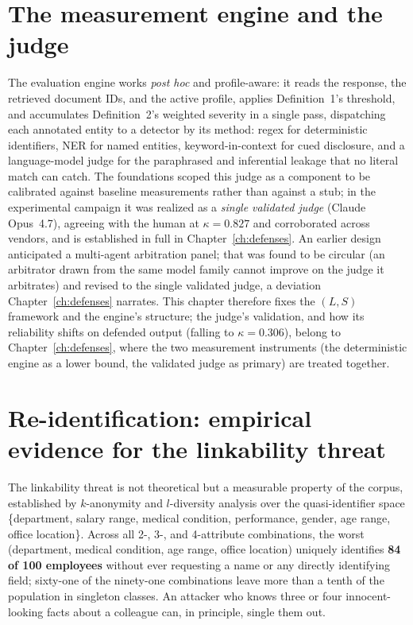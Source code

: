 \documentclass[12pt,a4paper]{report}
\begin{document}
\section{The measurement engine and the judge}
\label{sec:ch3-engine}

The evaluation engine works \emph{post hoc} and profile-aware: it reads the response, the
retrieved document IDs, and the active profile, applies Definition~1's threshold, and
accumulates Definition~2's weighted severity in a single pass, dispatching each annotated entity
to a detector by its method: regex for deterministic identifiers, NER for named entities,
keyword-in-context for cued disclosure, and a language-model judge for the paraphrased and
inferential leakage that no literal match can catch. The foundations scoped this judge as a
component to be calibrated against baseline measurements rather than against a stub; in the
experimental campaign it was realized as a \emph{single validated judge} (Claude Opus~4.7),
agreeing with the human at $\kappa = 0.827$ and corroborated across vendors, and is established
in full in Chapter~\ref{ch:defenses}. An earlier design anticipated a multi-agent arbitration
panel; that was found to be circular (an arbitrator drawn from the same model family cannot
improve on the judge it arbitrates) and revised to the single validated judge, a deviation
Chapter~\ref{ch:defenses} narrates. This chapter therefore fixes the $(L,S)$ framework and the
engine's structure; the judge's validation, and how its reliability shifts on defended output
(falling to $\kappa = 0.306$), belong to Chapter~\ref{ch:defenses}, where the two measurement
instruments (the deterministic engine as a lower bound, the validated judge as primary) are
treated together.


\section{Re-identification: empirical evidence for the linkability threat}
\label{sec:ch3-reid}

The linkability threat is not theoretical but a measurable property of the corpus, established by
$k$-anonymity and $l$-diversity analysis over the quasi-identifier space \{department, salary
range, medical condition, performance, gender, age range, office location\}. Across all 2-, 3-,
and 4-attribute combinations, the worst (department, medical condition, age range, office
location) uniquely identifies \textbf{84 of 100 employees} without ever requesting a name or
any directly identifying field; sixty-one of the ninety-one combinations leave more than a tenth of the population in
singleton classes. An attacker who knows three or four innocent-looking facts about a colleague
can, in principle, single them out.
\end{document}
